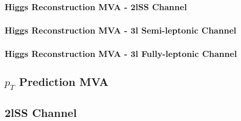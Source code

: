 
\subsubsection{Higgs Reconstruction MVA - 2lSS Channel}
\label{subsec:higgs2lSS}




\subsubsection{Higgs Reconstruction MVA - 3l Semi-leptonic Channel}
\label{subsec:higgs3lS}




\subsubsection{Higgs Reconstruction MVA - 3l Fully-leptonic Channel}                                  
\label{subsec:higgs3lF}                                                                                                   




\subsection{$p_T$ Prediction MVA}
\label{subsec:ptMVA}

\subsection{2lSS Channel}                                                                          
\label{subsec:pt2lSS}                                                                                           



